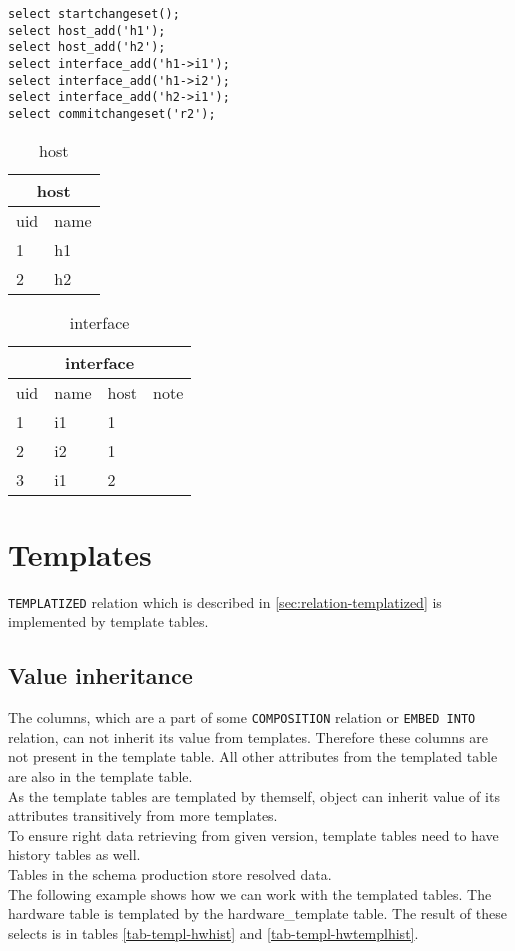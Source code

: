 \documentclass[deska]{subfiles}
\begin{document}
\begin{verbatim}
select startchangeset();
select host_add('h1');
select host_add('h2');
select interface_add('h1->i1');
select interface_add('h1->i2');
select interface_add('h2->i1');
select commitchangeset('r2');
\end{verbatim}

\begin{center}

\begin{table}
    \caption{host}
    \label{tab-embed-host}
\begin{tabular}{ | l | l | }
    \hline
    \multicolumn{2}{|c|}{host}\\
    \hline
    uid & name \\
    \hline
    1 & h1\\
    2 & h2\\
    \hline
\end{tabular}
\end{table}

\begin{table}
    \caption{interface}
    \label{tab-embed-interface}
\begin{tabular}{ | l | l | l | l | }
    \hline
    \multicolumn{4}{|c|}{interface}\\
    \hline
    uid & name & host & note\\
    \hline
    1 & i1 & 1 & \\
    2 & i2 & 1 & \\
    3 & i1 & 2 & \\
    \hline
\end{tabular}
\end{table}

\end{center}

\section{Templates}
{\tt TEMPLATIZED} relation which is described in \ref{sec:relation-templatized} is implemented by template tables. 

\subsection{Value inheritance}
The columns, which are a part of some {\tt COMPOSITION} relation or {\tt EMBED INTO} relation, can not inherit its value from templates. Therefore these columns are not present in the template table. All other attributes from the templated table are also in the template table.\\
As the template tables are templated by themself, object can inherit value of its attributes transitively from more templates.\\
To ensure right data retrieving from given version, template tables need to have history tables as well.\\
Tables in the schema production store resolved data.\\
The following example shows how we can work with the templated tables. The hardware table is templated by the hardware\_template table. The result of these selects is in tables \ref{tab-templ-hwhist} and \ref{tab-templ-hwtemplhist}.
\end{document}
